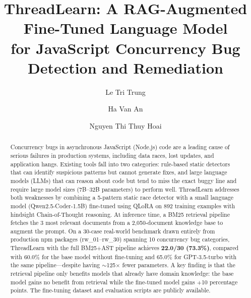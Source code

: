 \documentclass[runningheads]{llncs}
\begin{document}
\title{ThreadLearn: A RAG-Augmented Fine-Tuned Language Model\\
       for JavaScript Concurrency Bug Detection and Remediation}


\author{Le Tri Trung \and
        Ha Van An \and
        Nguyen Thi Thuy Hoai}



\maketitle

\begin{abstract}
Concurrency bugs in asynchronous JavaScript (Node.js) code are a leading
cause of serious failures in production systems, including data races,
lost updates, and application hangs.
Existing tools fall into two categories: rule-based static detectors that
can identify suspicious patterns but cannot generate fixes, and large
language models (LLMs) that can reason about code but tend to miss the
exact buggy line and require large model sizes (7B--32B parameters) to
perform well.
ThreadLearn addresses both weaknesses by combining a 5-pattern static
race detector with a small language model (Qwen2.5-Coder-1.5B) fine-tuned
using QLoRA on 892 training examples with hindsight Chain-of-Thought
reasoning.
At inference time, a BM25 retrieval pipeline fetches the 3 most relevant
documents from a 2,050-document knowledge base to augment the prompt.
On a 30-case real-world benchmark drawn entirely from production npm packages
(rw\_01--rw\_30) spanning 10 concurrency bug categories, ThreadLearn with
the full BM25+AST pipeline achieves \textbf{22.0/30 (73.3\%)},
compared with 60.0\% for the base model without fine-tuning and 65.0\% for
GPT-3.5-turbo with the same pipeline---despite having $\sim$125$\times$
fewer parameters.
A key finding is that the retrieval pipeline only benefits models that
already have domain knowledge: the base model gains no benefit from retrieval
while the fine-tuned model gains $+$10 percentage points.
The fine-tuning dataset and evaluation scripts are publicly available.

\end{abstract}
\end{document}
